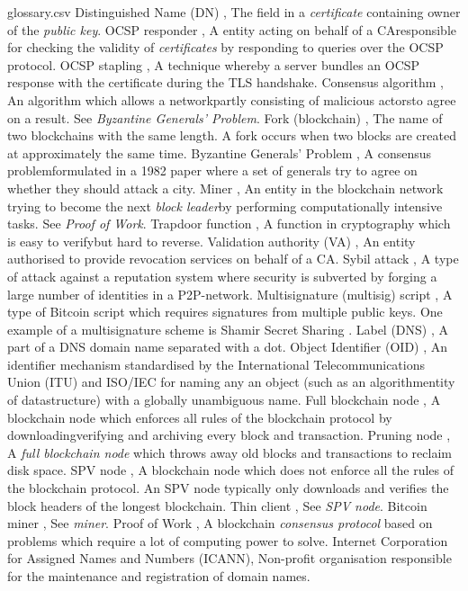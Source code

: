 \begin{filecontents*}{glossary.csv}
Distinguished Name (DN)           , The field in a \emph{certificate} containing owner of the \emph{public key}.
OCSP responder                    , A entity acting on behalf of a CA\comma responsible for checking the validity of \emph{certificates} by responding to queries over the OCSP protocol.
OCSP stapling                     , A technique whereby a server bundles an OCSP response with the certificate during the TLS handshake.
Consensus algorithm               , An algorithm which allows a network\comma partly consisting of malicious actors\comma to agree on a result. See \emph{Byzantine Generals' Problem}.
Fork (blockchain)                 , The name of two blockchains with the same length. A fork occurs when two blocks are created at approximately the same time.
Byzantine Generals' Problem       , A consensus problem\comma formulated in a 1982 paper \cite{Lamport82}\comma  where a set of generals try to agree on whether they should attack a city. 
Miner                             , An entity in the blockchain network trying to become the next \emph{block leader}\comma by performing computationally intensive tasks. See \emph{Proof of Work}.
Trapdoor function                 , A function in cryptography which is easy to verify\comma but hard to reverse.
Validation authority (VA)         , An entity authorised to provide revocation services on behalf of a CA.
Sybil attack                      , A type of attack against a reputation system where security is subverted by forging a large number of identities in a P2P-network. 
Multisignature (multisig) script  , A type of Bitcoin script which requires signatures from multiple public keys. One example of a multisignature scheme is Shamir Secret Sharing \cite{Shamir79}.
Label (DNS)                       , A part of a DNS domain name separated with a dot.
Object Identifier (OID)           , An identifier mechanism standardised by the International Telecommunications Union (ITU) and ISO/IEC for naming any an object (such as an algorithm\comma entity of datastructure) with a globally unambiguous name.
Full blockchain node              , A blockchain node which enforces all rules of the blockchain protocol by downloading\comma verifying and archiving every block and transaction.
Pruning node                      , A \emph{full blockchain node} which throws away old blocks and transactions to reclaim disk space.
SPV node                          , A blockchain node which does not enforce all the rules of the blockchain protocol. An SPV node typically only downloads and verifies the block headers of the longest blockchain.
Thin client                       , See \emph{SPV node}.
Bitcoin miner                     , See \emph{miner}.
Proof of Work                     , A blockchain \emph{consensus protocol} based on problems which require a lot of computing power to solve.
Internet Corporation for Assigned Names and Numbers (ICANN), Non-profit organisation responsible for the maintenance and registration of domain names. 
\end{filecontents*}


